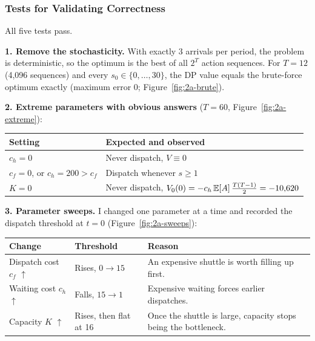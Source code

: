 \subsubsection{Tests for Validating Correctness}

All five tests pass.

\textbf{1. Remove the stochasticity.} With exactly 3 arrivals per period, the problem is deterministic, so the optimum is the best of all $2^T$ action sequences. For $T = 12$ (4,096 sequences) and every $s_0 \in \{0, \dots, 30\}$, the DP value equals the brute-force optimum exactly (maximum error 0; Figure~\ref{fig:2a-brute}).


\textbf{2. Extreme parameters with obvious answers} ($T = 60$, Figure~\ref{fig:2a-extreme}):

\begin{center}
\begin{tabular}{@{}ll@{}}
  \toprule
  \textbf{Setting} & \textbf{Expected and observed} \\
  \midrule
  $c_h = 0$ & Never dispatch, $V \equiv 0$ \\
  $c_f = 0$, or $c_h = 200 > c_f$ & Dispatch whenever $s \geq 1$ \\
  $K = 0$ & Never dispatch, $V_0(0) = -c_h\,\mathbb{E}[A]\,\frac{T(T-1)}{2} = -10{,}620$ \\
  \bottomrule
\end{tabular}
\end{center}


\textbf{3. Parameter sweeps.} I changed one parameter at a time and recorded the dispatch threshold at $t = 0$ (Figure~\ref{fig:2a-sweeps}):

\begin{center}
\small
\begin{tabularx}{\textwidth}{@{}llL@{}}
  \toprule
  \textbf{Change} & \textbf{Threshold} & \textbf{Reason} \\
  \midrule
  Dispatch cost $c_f$ $\uparrow$ & Rises, $0 \to 15$ & An expensive shuttle is worth filling up first. \\
  Waiting cost $c_h$ $\uparrow$ & Falls, $15 \to 1$ & Expensive waiting forces earlier dispatches. \\
  Capacity $K$ $\uparrow$ & Rises, then flat at 16 & Once the shuttle is large, capacity stops being the bottleneck. \\
  \bottomrule
\end{tabularx}
\end{center}

